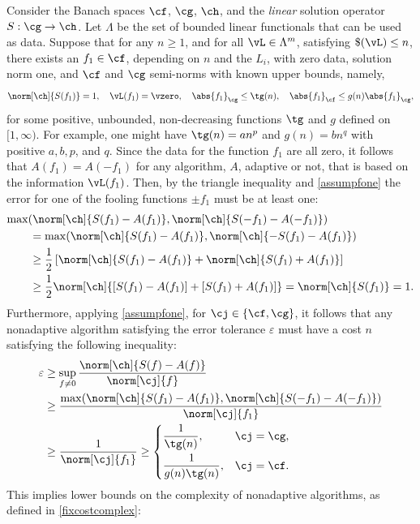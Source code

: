 \documentclass[]{elsarticle}
\theoremstyle{definition}
\theoremstyle{remark}
\newcommand{\Fnorm}[1]{\abs{#1}_{\cf}}
\newcommand{\Gnorm}[1]{\abs{#1}_{\cg}}
\begin{document}
Consider the Banach spaces $\cf$, $\cg$, $\ch$, and the \emph{linear} solution operator $S: \cg \to \ch$.  Let $\Lambda$ be the set of bounded linear functionals that can be used as data. Suppose that for any $n\ge 1$, and for all $\vL \in \Lambda^m$, satisfying $\$(\vL)\le n$, there exists an $f_1 \in \cf$, depending on $n$ and the $L_i$, with zero data, solution norm one, and $\cf$ and $\cg$ semi-norms with known upper bounds, namely,
\begin{equation} \label{assumpfone}
\norm[\ch]{S(f_1)} = 1, \quad \vL(f_1)= \vzero, \quad
\Gnorm{f_1} \le \tg(n), \quad \Fnorm{f_1} \le g(n) \Gnorm{f_1}, 
\end{equation}
for some positive, unbounded, non-decreasing functions $\tg$ and $g$ defined on $[1,\infty)$.  For example, one might have $\tg(n)=a n ^p$ and $g(n)=b n^q$ with positive $a, b, p$, and $q$.  Since the data for the function $f_1$ are all zero, it follows that $A(f_1)=A(-f_1)$ for any algorithm, $A$, adaptive or not, that is based on the information $\vL(f_1)$.  Then, by the triangle inequality and \eqref{assumpfone} the error for one of the fooling functions $\pm f_1$ must be at least one:
\begin{align*}
\MoveEqLeft{\max(\norm[\ch]{S(f_1)-A(f_1)},\norm[\ch]{S(-f_1)-A(-f_1)})} \\
& = \max(\norm[\ch]{S(f_1)-A(f_1)},\norm[\ch]{-S(f_1)-A(f_1)})\\
& \ge \frac{1}{2} \left[ \norm[\ch]{S(f_1)-A(f_1)}+ \norm[\ch]{S(f_1)+A(f_1)} \right] \\
& \ge \frac{1}{2} \norm[\ch]{[S(f_1)-A(f_1)]+[S(f_1)+A(f_1)]} = \norm[\ch]{S(f_1)}=1.
\end{align*}
Furthermore, applying \eqref{assumpfone}, for $\cj \in \{\cf,\cg\}$, it follows that any nonadaptive algorithm satisfying the error tolerance $\varepsilon$ must have a cost $n$ satisfying the following inequality:
\begin{align*}
\varepsilon & \ge \sup_{f \ne 0} \frac{\norm[\ch]{S(f)-A(f)}}{\norm[\cj]{f}} \\
& \ge \frac{\max(\norm[\ch]{S(f_1)-A(f_1)},\norm[\ch]{S(-f_1)-A(-f_1)})}{\norm[\cj]{f_1}} \\
& \ge \frac{1}{\norm[\cj]{f_1}} 
\ge \begin{cases} \displaystyle \frac{1}{\tg(n)}, & \cj=\cg,\\[2ex]
 \displaystyle  \frac{1}{g(n)\tg(n)}, & \cj=\cf.
\end{cases}
\end{align*}
This implies lower bounds on the complexity of nonadaptive algorithms, as defined in \eqref{fixcostcomplex}:
\end{document}
